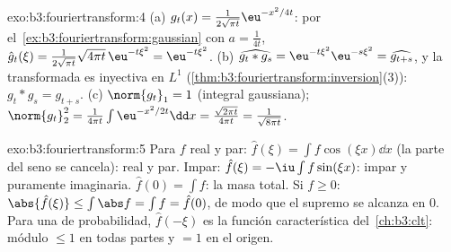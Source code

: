 \begin{solution}{exo:b3:fouriertransform:4}
(a) $g_t(x) = \frac1{2\sqrt{\pi t}}\eu^{-x^2/4t}$: por
el~\cref{ex:b3:fouriertransform:gaussian} con $a = \frac1{4t}$,
$\hat g_t(\xi) = \frac1{2\sqrt{\pi t}}\sqrt{4\pi
t}\,\eu^{-t\xi^2} = \eu^{-t\xi^2}$.
(b) $\widehat{g_t * g_s} = \eu^{-t\xi^2}\eu^{-s\xi^2} =
\widehat{g_{t+s}}$, y la transformada es inyectiva en $L^1$
(\cref{thm:b3:fouriertransform:inversion}(3)): $g_t * g_s =
g_{t+s}$.
(c) $\norm{g_t}_1 = 1$ (integral gaussiana);
$\norm{g_t}_2^2 = \frac1{4\pi t}\int\eu^{-x^2/2t}\dd x =
\frac{\sqrt{2\pi t}}{4\pi t} = \frac1{\sqrt{8\pi t}}$.
\end{solution}

\begin{solution}{exo:b3:fouriertransform:5}
Para $f$ real y par: $\hat f(\xi) = \int f\cos(\xi x)\dd x$ (la parte
del seno se cancela): real y par. Impar: $\hat f(\xi) =
-\iu\int f\sin(\xi x)$: impar y puramente imaginaria. $\hat f(0) =
\int f$: la masa total. Si $f \geq 0$: $\abs{\hat f(\xi)}
\leq \int\abs f = \int f = \hat f(0)$, de modo que el supremo se alcanza
en $0$. Para una  de
probabilidad, $\hat f(-\xi)$ es la función característica
del~\cref{ch:b3:clt}: módulo $\leq 1$ en todas partes y $= 1$ en el
origen.
\end{solution}

